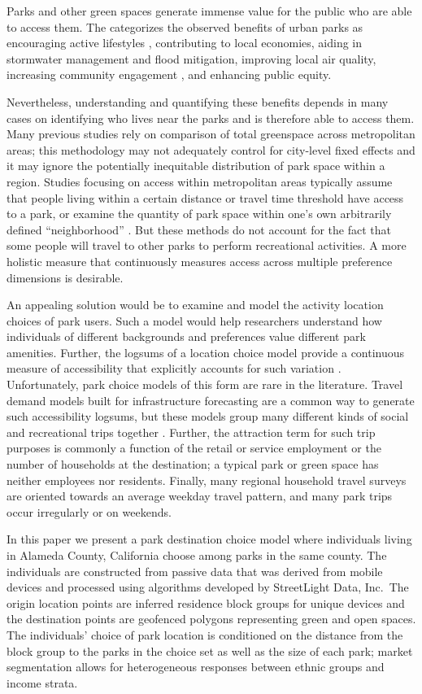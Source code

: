 \documentclass[]{elsarticle} %
\begin{document}
Parks and other green spaces generate immense value for the public who are able
to access them. The \citet{CityParksAlliance} categorizes the observed benefits of
urban parks as encouraging active lifestyles \citep{Bancroft2015}, contributing to
local economies, aiding in stormwater management and flood mitigation,
improving local air quality, increasing community engagement \citep{Madzia2018}, and
enhancing public equity.

Nevertheless, understanding and quantifying these benefits depends in many
cases on identifying who lives near the parks and is therefore able to access
them. Many previous studies \citep[e.g.,][]{Richardson2012} rely on comparison of total
greenspace across metropolitan areas; this methodology may not adequately
control for city-level fixed effects and it may ignore the potentially
inequitable distribution of park space within a region. Studies focusing on
access within metropolitan areas typically assume that people living within a
certain distance or travel time threshold have access to a park, or examine the
quantity of park space within one's own arbitrarily defined ``neighborhood''
\citep[Stark2014]{Mitchell2008}. But these methods do not account for the fact that
some people will travel to other parks to perform recreational activities. A
more holistic measure that continuously measures access across multiple
preference dimensions is desirable.

An appealing solution would be to examine and model the activity location
choices of park users. Such a model would help researchers understand how
individuals of different backgrounds and preferences value different park
amenities. Further, the logsums of a location choice model provide a continuous
measure of accessibility that explicitly accounts for such variation
\citep{DeJong2007}. Unfortunately, park choice models of this form are rare in the
literature. Travel demand models built for infrastructure forecasting are a
common way to generate such accessibility logsums, but these models group many
different kinds of social and recreational trips together \citep{nchrp716}. Further,
the attraction term for such trip purposes is commonly a function of the retail
or service employment or the number of households at the destination; a typical
park or green space has neither employees nor residents. Finally, many regional
household travel surveys are oriented towards an average weekday travel
pattern, and many park trips occur irregularly or on weekends.

In this paper we present a park destination choice model where individuals
living in Alameda County, California choose among parks in the same county. The
individuals are constructed from passive data that was derived from mobile
devices and processed using algorithms developed by StreetLight Data, Inc.~The
origin location points are inferred residence block groups for unique devices
and the destination points are geofenced polygons representing green and open
spaces. The individuals' choice of park location is conditioned on the distance
from the block group to the parks in the choice set as well as the size of each
park; market segmentation allows for heterogeneous responses between ethnic
groups and income strata.
\end{document}
